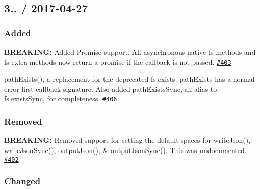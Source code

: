 \subsection*{3.. / 2017-\/04-\/27 }

\subsubsection*{Added}


\begin{DoxyItemize}
\item {\bfseries B\+R\+E\+A\+K\+I\+NG\+:} Added Promise support. All asynchronous native fs methods and fs-\/extra methods now return a promise if the callback is not passed. \href{https://github.com/jprichardson/node-fs-extra/pull/403}{\tt \#403}
\item {\ttfamily path\+Exists()}, a replacement for the deprecated {\ttfamily fs.\+exists}. {\ttfamily path\+Exists} has a normal error-\/first callback signature. Also added {\ttfamily path\+Exists\+Sync}, an alias to {\ttfamily fs.\+exists\+Sync}, for completeness. \href{https://github.com/jprichardson/node-fs-extra/pull/406}{\tt \#406}
\end{DoxyItemize}

\subsubsection*{Removed}


\begin{DoxyItemize}
\item {\bfseries B\+R\+E\+A\+K\+I\+NG\+:} Removed support for setting the default spaces for {\ttfamily write\+Json()}, {\ttfamily write\+Json\+Sync()}, {\ttfamily output\+Json()}, \& {\ttfamily output\+Json\+Sync()}. This was undocumented. \href{https://github.com/jprichardson/node-fs-extra/pull/402}{\tt \#402}
\end{DoxyItemize}

\subsubsection*{Changed}


